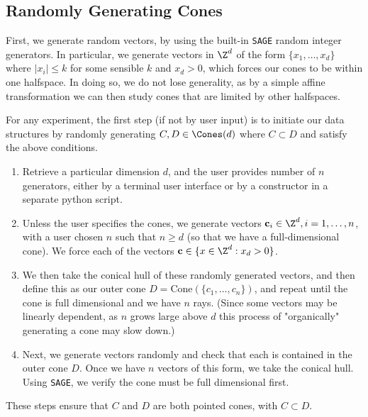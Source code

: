 \documentclass{TC}
\begin{document}
\subsection{Randomly Generating Cones}
First, we generate random vectors, by using the built-in  \texttt{SAGE} random integer generators. In particular, we generate vectors in $\Z^d$ of the form $\{x_1 , \ldots, x_d\}$ where $ |x_i| \leq k$ for some sensible $k$ and $x_d > 0$, which forces our cones to be within one halfspace. In doing so, we do not lose generality, as by a simple affine transformation we can then study cones that are limited by other halfspaces.



For any experiment, the first step (if not by user input) is to initiate our data structures by randomly generating $C, D \in \Cones(d)$ where $C \subset D$ and satisfy the above conditions.
 
\begin{enumerate}
\item Retrieve a particular dimension $d$, and the user provides number of $n$ generators, either by a terminal user interface or by a constructor in a separate python script.

\item Unless the user specifies the cones, we generate vectors $\mathbf c_i \in \Z^d, i = 1, \ldots, n$, with a user chosen $n$ such that $n \geq d$ (so that we have a full-dimensional cone). We force each of the vectors $\mathbf c \in \{ x \in \Z^d : x_d > 0\}$.

\item We then take the conical hull of these randomly generated vectors, and then define this as our outer cone $D = \mathrm{Cone}(\{c_1,\ldots, c_n\})$, and repeat until the cone is full dimensional and we have $n$ rays. (Since some vectors may be linearly dependent, as $n$ grows large above $d$ this process of "organically" generating a cone may slow down.)

\item Next, we generate vectors randomly and check that each is contained in the outer cone $D$. Once we have $n$ vectors of this form, we take the conical hull. Using \texttt{SAGE}, we verify the cone must be full dimensional first. 

\end{enumerate}
These steps ensure that $C$ and $D$ are both pointed cones, with $C \subset D$. 
\end{document}
